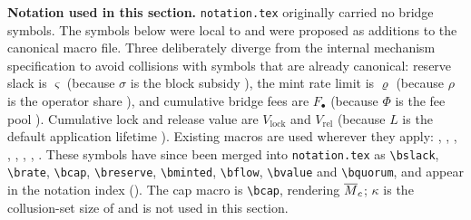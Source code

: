 \medskip
\noindent\textbf{Notation used in this section.} \texttt{notation.tex} originally carried no bridge symbols.
The symbols below were local to  and were proposed as additions to the canonical macro
file. Three deliberately diverge from the internal mechanism specification to avoid collisions with
symbols that are already canonical: reserve slack is $\varsigma$ (because $\sigma$ is the block
subsidy \subsidy), the mint rate limit is $\varrho$ (because $\rho$ is the \PNR operator
share \nodeshare), and cumulative bridge fees are $F_\bullet$ (because $\Phi$ is the \PNR fee pool
\pool). Cumulative lock and release value are $V_{\mathrm{lock}}$ and $V_{\mathrm{rel}}$ (because
$L$ is the default application lifetime \blockslasting). Existing macros are used wherever they
apply: \hgt, \supply, \flux, \sat, \adv, \advbudget, , \maxmoney.
These symbols have since been merged into \texttt{notation.tex} as
\texttt{\textbackslash bslack}, \texttt{\textbackslash brate}, \texttt{\textbackslash bcap},
\texttt{\textbackslash breserve}, \texttt{\textbackslash bminted}, \texttt{\textbackslash bflow},
\texttt{\textbackslash bvalue} and \texttt{\textbackslash bquorum}, and appear in the notation index
(). The cap macro is \texttt{\textbackslash bcap}, rendering $\overline{M}_{c}$;
$\kappa$ is the collusion-set size of  and is not used in this section.


